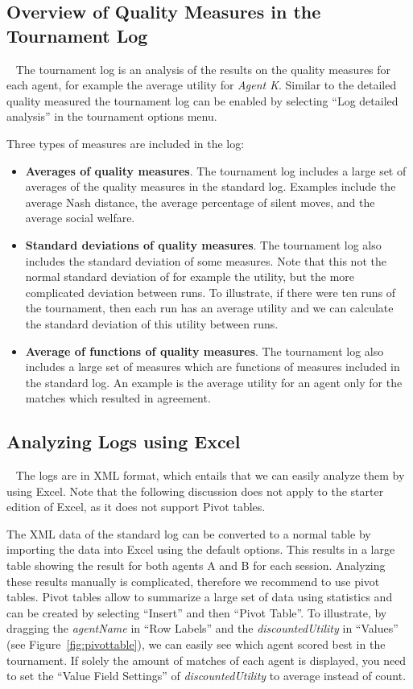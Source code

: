 \documentclass[]{article}
\begin{document}
\subsection{Overview of Quality Measures in the Tournament Log}~\label{sec:tournamentLog}
The tournament log is an analysis of the results on the quality measures for each agent, for example the average utility for \textit{Agent K}. Similar to the detailed quality measured the tournament log can be enabled by selecting ``Log detailed analysis'' in the tournament options menu.

Three types of measures are included in the log:
\begin{itemize}
	\item \textbf{Averages of quality measures}. The tournament log includes a large set of averages of the quality measures in the standard log. Examples include the average Nash distance, the average percentage of silent moves, and the average social welfare.
	\item \textbf{Standard deviations of quality measures}. The tournament log also includes the standard deviation of some measures. Note that this not the normal standard deviation of for example the utility, but the more complicated deviation between runs. To illustrate, if there were ten runs of the tournament, then each run has an average utility and we can calculate the standard deviation of this utility between runs.
	\item \textbf{Average of functions of quality measures}. The tournament log also includes a large set of measures which are functions of measures included in the standard log. An example is the average utility for an agent only for the matches which resulted in agreement. 
\end{itemize}

\subsection{Analyzing Logs using Excel}~\label{sec:analysisExcel}
The logs are in XML format, which entails that we can easily analyze them by using Excel. Note that the following discussion does not apply to the starter edition of Excel, as it does not support Pivot tables.

The XML data of the standard log can be converted to a normal table by importing the data into Excel using the default options. This results in a large table showing the result for both agents A and B for each session. Analyzing these results manually is complicated, therefore we recommend to use pivot tables. Pivot tables allow to summarize a large set of data using statistics and can be created by selecting ``Insert'' and then ``Pivot Table''. To illustrate, by dragging the \textit{agentName} in ``Row Labels'' and the \textit{discountedUtility} in ``Values'' (see Figure~\ref{fig:pivottable}), we can easily see which agent scored best in the tournament. If solely the amount of matches of each agent is displayed, you need to set the ``Value Field Settings'' of \textit{discountedUtility} to average instead of count.
\end{document}
